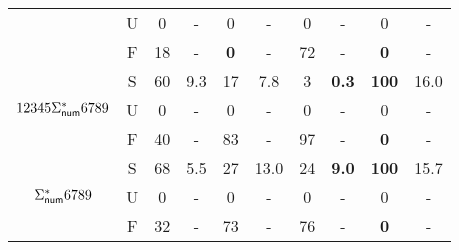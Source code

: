 \begin{table}[ht]
\begin{tabular}{|c|c|c|c|c|c|c|c|c|c|}
        & U & 0 & - & 0 & - & 0 & - & 0 & - \\
         \cline{2-10}
        & F & 18 & - & {\bf 0} & - & 72 & - & {\bf 0} & - \\ \hline
        \cline{1-10}
       \multirow{3}{*}{\scriptsize{$12345\Sigma^*_{\sf num}6789$}} & S & 60 & 9.3 & 17 & 7.8 & 3 & {\bf 0.3} & {\bf 100} & 16.0 \\
        \cline{2-10}
        & U & 0 & - & 0 & - & 0 & - & 0 & - \\
         \cline{2-10}
        & F & 40 & - & 83 & - & 97 & - & {\bf 0} & - \\ \hline
        \cline{1-10}
       \multirow{3}{*}{\scriptsize{$\Sigma^*_{\sf num}6789$}} & S & 68 & 5.5 & 27 & 13.0 & 24 & {\bf 9.0} & {\bf 100} & 15.7 \\
        \cline{2-10}
        & U & 0 & - & 0 & - & 0 & - & 0 & - \\
         \cline{2-10}
        & F & 32 & - & 73 & - & 76 & - & {\bf 0} &- \\
        \hline
       \end{tabular}
           \label{table:string}
\end{table}
